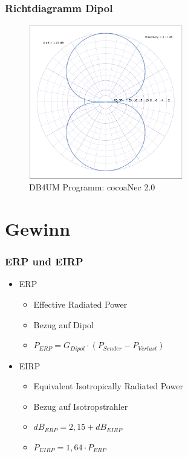 \begin{frame}
  \frametitle{Richtdiagramm Dipol}
  \begin{center}
    \begin{figure}
      \includegraphics[width=0.6\textwidth,height=.75\textheight,keepaspectratio]{e11/Richt-Dipol.png}
      \caption{DB4UM Programm: cocoaNec 2.0}
    \end{figure}
  \end{center}
\end{frame}

\section*{Gewinn}

\begin{frame}
  \frametitle{ERP und EIRP}
  \begin{itemize}
    \item ERP
      \begin{itemize}
        \item Effective Radiated Power
        \item Bezug auf Dipol
        \item $P_{ERP} = G_{Dipol} \cdot (P_{Sender} - P_{Verlust})$
      \end{itemize}
    \item EIRP
      \begin{itemize}
        \item Equivalent Isotropically Radiated Power
        \item Bezug auf Isotropstrahler
        \item $dB_{ERP} = 2,15 + dB_{EIRP}$
        \item $P_{EIRP} = 1,64 \cdot P_{ERP}$
      \end{itemize}
  \end{itemize}
\end{frame}


